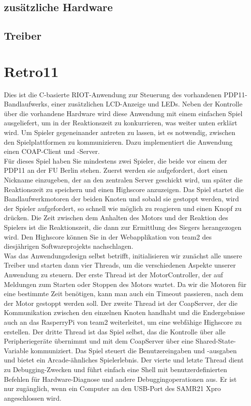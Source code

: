 \documentclass[a4paper]{article}
\begin{document}
  \subsection{zusätzliche Hardware}

  \subsection{Treiber}

\section{Retro11}
Dies ist die C-basierte RIOT-Anwendung zur Steuerung des vorhandenen
PDP11-Bandlaufwerks, einer zusätzlichen LCD-Anzeige und LEDs. Neben der
Kontrolle über die vorhandene Hardware wird diese Anwendung mit einem einfachen
Spiel ausgeliefert, um in der Reaktionszeit zu konkurrieren, was weiter unten
erklärt wird. Um Spieler gegeneinander antreten zu lassen, ist es notwendig,
zwischen den Spielplattformen zu kommunizieren. Dazu implementiert die
Anwendung einen COAP-Client und -Server.\\
Für dieses Spiel haben Sie mindestens zwei Spieler, die beide vor einem der
PDP11 an der FU Berlin stehen. Zuerst werden sie aufgefordert, dort einen
Nickname einzugeben, der an den zentralen Server geschickt wird, um später die
Reaktionszeit zu speichern und einen Highscore anzuzeigen. Das Spiel startet
die Bandlaufwerkmotoren der beiden Knoten und sobald sie gestoppt werden, wird
der Spieler aufgefordert, so schnell wie möglich zu reagieren und einen Knopf
zu drücken. Die Zeit zwischen dem Anhalten des Motors und der Reaktion des
Spielers ist die Reaktionszeit, die dann zur Ermittlung des Siegers
herangezogen wird. Den Highscore können Sie in der Webapplikation von team2 des
diesjährigen Softwareprojekts nachschlagen.\\
Was das Anwendungsdesign selbst betrifft, initialisieren wir zunächst alle
unsere Treiber und starten dann vier Threads, um die verschiedenen Aspekte
unserer Anwendung zu steuern. Der erste Thread ist der MotorController, der auf
Meldungen zum Starten oder Stoppen des Motors wartet. Da wir die Motoren für
eine bestimmte Zeit benötigen, kann man auch ein Timeout passieren, nach dem
der Motor gestoppt werden soll. Der zweite Thread ist der CoapServer, der die
Kommunikation zwischen den einzelnen Knoten handhabt und die Endergebnisse auch
an das RasperryPi von team2 weiterleitet, um eine webfähige Highscore zu
erstellen. Der dritte Thread ist das Spiel selbst, das die Kontrolle über alle
Peripheriegeräte übernimmt und mit dem CoapServer über eine
Shared-State-Variable kommuniziert. Das Spiel steuert die Benutzereingaben und
-ausgaben und bietet ein Arcade-ähnliches Spielerlebnis. Der vierte und letzte
Thread dient zu Debugging-Zwecken und führt einfach eine Shell mit
benutzerdefinierten Befehlen für Hardware-Diagnose und andere
Debuggingoperationen aus. Er ist nur zugänglich, wenn ein Computer an den
USB-Port des SAMR21 Xpro angeschlossen wird.\\
\end{document}
